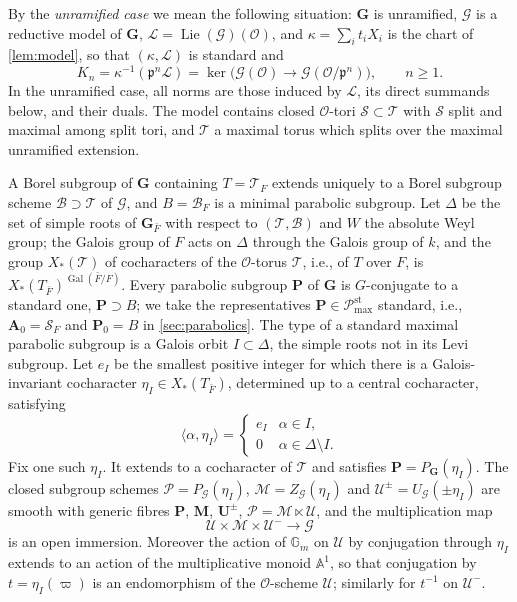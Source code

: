 \documentclass[11pt,reqno]{amsart}
\numberwithin{equation}{section}
\theoremstyle{plain}
\theoremstyle{definition}
\theoremstyle{remark}
\theoremstyle{plain}
\newcommand{\Gm}{\mathbb{G}_m}   %
\newcommand{\OO}{\mathcal{O}}    %
\newcommand{\pp}{\mathfrak{p}}   %
\newcommand{\Lat}{\mathcal{L}}   %
\newcommand{\Aff}{\mathbb{A}}    %
\newcommand{\bG}{\mathbf{G}}     %
\newcommand{\bA}{\mathbf{A}}     %
\newcommand{\bP}{\mathbf{P}}     %
\newcommand{\bM}{\mathbf{M}}     %
\newcommand{\bU}{\mathbf{U}}     %
\newcommand{\g}{\mathfrak{g}}    %
\newcommand{\Pc}{\mathscr{P}^{\mathrm{st}}_{\mathrm{max}}}    %
\newcommand{\cG}{\mathcal{G}}                   %
\newcommand{\cP}{\mathcal{P}}                   %
\newcommand{\cM}{\mathcal{M}}                   %
\newcommand{\cU}{\mathcal{U}}                   %
\newcommand{\cT}{\mathcal{T}}                   %
\newcommand{\cB}{\mathcal{B}}                   %
\newcommand{\cS}{\mathcal{S}}                   %
\DeclareMathOperator{\Lie}{Lie}
\DeclareMathOperator{\Gal}{Gal}
\begin{document}
By the \emph{unramified case} we mean the following situation: $\bG$ is
unramified, $\cG$ is a reductive model of $\bG$, $\Lat=\Lie(\cG)(\OO)$, and
$\kappa=\sum_it_iX_i$ is the chart of \cref{lem:model}, so that
$(\kappa,\Lat)$ is standard and
\begin{equation}\label{eq:integralKn}
K_n=\kappa^{-1}(\pp^n\Lat)=\ker\bigl(\cG(\OO)\to\cG(\OO/\pp^n)\bigr),\qquad n\ge1.
\end{equation}
In the unramified case, all norms are those induced by $\Lat$, its
direct summands below, and their duals.
The model contains closed $\OO$-tori $\cS\subset\cT$ with $\cS$
split and maximal among split tori, and $\cT$ a maximal torus which splits
over the maximal unramified extension.

A Borel subgroup of $\bG$ containing $T=\cT_F$
extends uniquely to a Borel subgroup scheme $\cB\supset\cT$ of $\cG$, and
$B=\cB_F$ is a minimal parabolic subgroup. Let $\Delta$ be the set of
simple roots of $\bG_{\bar F}$ with respect to $(\cT,\cB)$ and $W$ the
absolute Weyl group; the Galois group of $F$ acts on $\Delta$ through
the Galois group of $k$, and the group $X_*(\cT)$ of cocharacters of the
$\OO$-torus $\cT$, i.e., of $T$ over $F$, is $X_*(T_{\bar F})^{\Gal(\bar F/F)}$.
Every parabolic subgroup $\bP$ of $\bG$ is $G$-conjugate to a standard
one, $\bP\supset B$; we take the representatives $\bP\in\Pc$ standard, i.e., $\bA_0=\cS_F$ and $\bP_0=B$ in \cref{sec:parabolics}.
The type of a standard maximal parabolic subgroup is a Galois orbit
$I\subset\Delta$, the simple roots not in its Levi subgroup. Let $e_I$ be the smallest positive integer for which there is a
Galois-invariant cocharacter $\eta_I\in X_*(T_{\bar F})$, determined up to a central cocharacter, satisfying
\begin{equation}\label{eq:cocharchoice}
\langle\alpha,\eta_I\rangle=
\begin{cases}e_I&\alpha\in I,\\0&\alpha\in\Delta\setminus I.\end{cases}
\end{equation}
Fix one such $\eta_I$.
It extends to a cocharacter of $\cT$ and satisfies $\bP=P_{\bG}(\eta_I)$.
The closed subgroup schemes
$\cP=P_{\cG}(\eta_I)$, $\cM=Z_{\cG}(\eta_I)$ and $\cU^\pm=U_{\cG}(\pm\eta_I)$
are smooth with generic fibres $\bP$, $\bM$, $\bU^\pm$, $\cP=\cM\ltimes\cU$,
and the multiplication map
\begin{equation}\label{eq:integralcell}
\cU\times\cM\times\cU^-\to\cG
\end{equation}
is an open immersion. Moreover the action of $\Gm$ on $\cU$ by
conjugation through $\eta_I$ extends to an action of the multiplicative
monoid $\Aff^1$, so that conjugation by $t=\eta_I(\varpi)$ is an endomorphism of the
$\OO$-scheme $\cU$; similarly for $t^{-1}$ on $\cU^-$.
\end{document}
